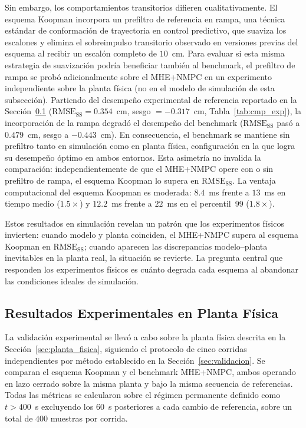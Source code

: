 \documentclass[12pt,letterpaper]{article}
\begin{document}
Sin embargo, los comportamientos transitorios difieren
cualitativamente. El esquema Koopman incorpora un prefiltro
de referencia en rampa, una técnica estándar de conformación
de trayectoria en control predictivo, que suaviza los escalones
y elimina el sobreimpulso transitorio observado en versiones
previas del esquema al recibir un escalón completo de $10$~cm.
Para evaluar si esta misma estrategia de suavización podría
beneficiar también al benchmark, el prefiltro de rampa se probó
adicionalmente sobre el MHE+NMPC en un experimento independiente
sobre la planta física (no en el modelo de simulación de esta
subsección). Partiendo del desempeño experimental de referencia
reportado en la Sección~\ref{sec:resultados_exp}
($\mathrm{RMSE}_{\mathrm{SS}} = 0.354$~cm, sesgo $= -0.317$~cm,
Tabla~\ref{tab:cmp_exp}), la incorporación de la rampa degradó el
desempeño del benchmark ($\mathrm{RMSE}_{\mathrm{SS}}$ pasó a
$0.479$~cm, sesgo a $-0.443$~cm). En consecuencia, el benchmark se
mantiene sin prefiltro tanto en simulación como en planta física,
configuración en la que logra su desempeño óptimo en ambos
entornos. Esta asimetría no invalida la comparación:
independientemente de que el MHE+NMPC opere con o sin prefiltro
de rampa, el esquema Koopman lo supera en $\mathrm{RMSE}_{\mathrm{SS}}$.
La ventaja computacional del esquema Koopman es moderada:
$8.4$~ms frente a $13$~ms en tiempo medio ($1.5\times$) y
$12.2$~ms frente a $22$~ms en el percentil~99 ($1.8\times$).

Estos resultados en simulación revelan un patrón que los
experimentos físicos invierten: cuando modelo y planta
coinciden, el MHE+NMPC supera al esquema Koopman en
$\mathrm{RMSE}_{\mathrm{SS}}$; cuando aparecen las
discrepancias modelo--planta inevitables en la planta real,
la situación se revierte. La pregunta central que responden
los experimentos físicos es cuánto degrada cada esquema al
abandonar las condiciones ideales de simulación.
\subsection{Resultados Experimentales en Planta Física}
\label{sec:resultados_exp}

La validación experimental se llevó a cabo sobre la planta 
física descrita en la Sección~\ref{sec:planta_fisica}, 
siguiendo el protocolo de cinco corridas independientes por 
método establecido en la Sección~\ref{sec:validacion}. Se 
comparan el esquema Koopman y el benchmark MHE+NMPC, ambos 
operando en lazo cerrado sobre la misma planta y bajo la 
misma secuencia de referencias. Todas las métricas se 
calcularon sobre el régimen permanente definido como 
$t > 400$~s excluyendo los $60$~s posteriores a cada cambio 
de referencia, sobre un total de $400$ muestras por corrida.
\end{document}
